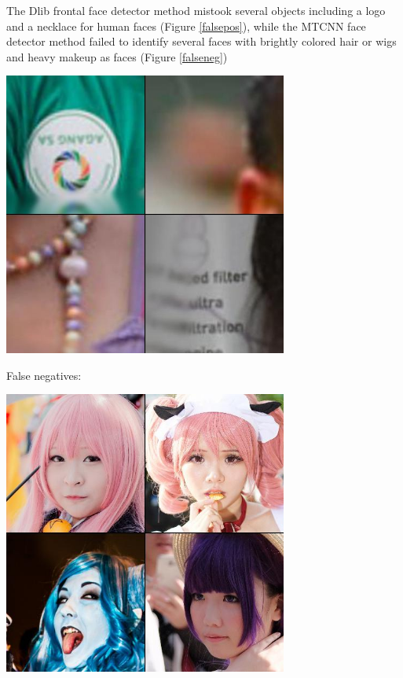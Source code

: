 \documentclass[11pt, letterpaper]{article}
\newenvironment{Figure}
  {\par\medskip\noindent\minipage{\linewidth}}
  {\endminipage\par\medskip}
\begin{document}
\begin{multicols}{2}
  The Dlib frontal face detector method mistook several objects including a logo
  and a necklace for human faces (Figure \ref{falsepos}), while the MTCNN face
  detector method failed to identify several faces with brightly colored hair or
  wigs and heavy makeup as faces (Figure \ref{falseneg})

  \begin{Figure}
    \centering
    \includegraphics[width=0.7\textwidth]{figures/false-positives.jpg}
    \label{falsepos}
  \end{Figure}

  False negatives:

  \begin{Figure}
    \centering
    \includegraphics[width=0.7\textwidth]{figures/false-negatives.jpg}
    \label{falseneg}
  \end{Figure}



\end{multicols}
\end{document}
